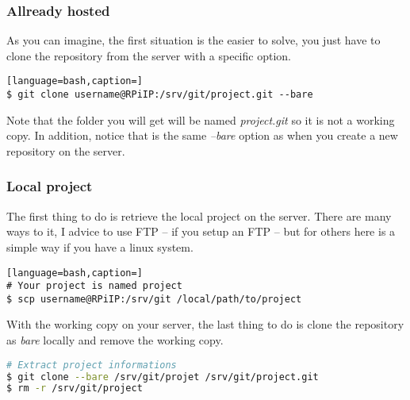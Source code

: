 \subsubsection{Allready hosted}
As you can imagine, the first situation is the easier to solve, you just have to 
clone the repository from the server with a specific option.

\begin{lstlisting}[language=bash,caption=]
$ git clone username@RPiIP:/srv/git/project.git --bare
\end{lstlisting}

Note that the folder you will get will be named \emph{project.git} so it is not a 
working copy. In addition, notice that is the same \emph{--bare} option as when 
you create a new repository on the server.

\subsubsection{Local project}
The first thing to do is retrieve the local project on the server. There are many 
ways to it, I advice to use FTP -- if you setup an FTP -- but for others here is 
a simple way if you have a linux system.

\begin{lstlisting}[language=bash,caption=]
# Your project is named project
$ scp username@RPiIP:/srv/git /local/path/to/project
\end{lstlisting}

With the working copy on your server, the last thing to do is clone the repository 
as \emph{bare} locally and remove the working copy.

\begin{lstlisting}[language=bash,caption=Host repository from local copy]
# Extract project informations
$ git clone --bare /srv/git/projet /srv/git/project.git
$ rm -r /srv/git/project
\end{lstlisting}
	
\begin{comment}
	\begin{lstlisting}[language=bash,caption=Host repository from local copy]
# Extract project informations
$ mv /srv/git/project/.git /srv/git/project.git
$ rm -r /srv/git/project

# Declare repository as bare
$ cd /sr	v/git/project.git
$ git config --bool core.bare true
	\end{lstlisting}
\end{comment}

